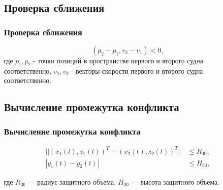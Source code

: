 \documentclass[10pt,t]{beamer}
\begin{document}
\subsection[Проверка сближения]{Проверка сближения}
\begin{frame}
\frametitle{Проверка сближения}
\small

\begin{figure}[ht!]
\end{figure}

$$(p_2 - p_1, v_2 - v_1 ) < 0,$$
где $p_1, p_2$ - точки позиций в пространстве первого и второго судна соответственно, 
$v_1, v_2$ - векторы скорости первого и второго судна соответственно.

\end{frame}

\subsection[Вычисление промежутка конфликта]{Вычисление промежутка конфликта}
\begin{frame}
\frametitle{Вычисление промежутка конфликта}
\small

\begin{align*}
    ||(x_1(t), z_1(t))^T - (x_2(t), z_2(t))^T|| &\leq R_{30},\\
    |y_1(t) - y_2(t)| &\leq H_{30},
\end{align*}

где $R_{30}$ --- радиус защитного объема, $H_{30}$ --- высота защитного объема. 

\end{frame}
\end{document}
